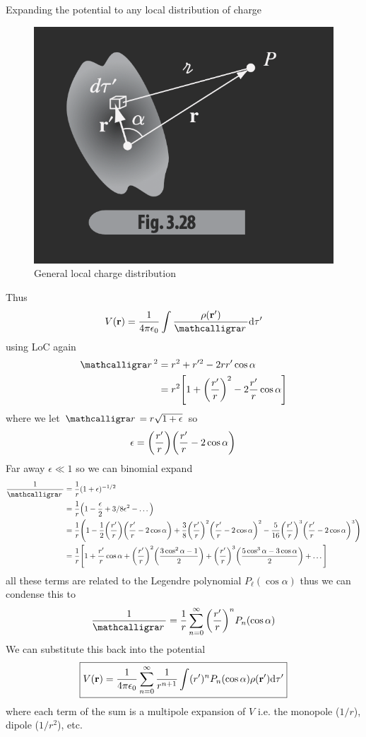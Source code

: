\documentclass[../main.tex]{subfiles}
\begin{document}
\newpage
Expanding the potential to any local distribution of charge
\begin{figure}
    \centering
    \includegraphics[width=0.4\linewidth]{fig3_28.png}
    \caption{General local charge distribution}
    \label{fig:lecture3_28}
\end{figure}
Thus
\begin{align*}
    V(\vb r) = \ke \int \frac{\rho(\vb r')}{\scriptr} \dd\tau'
\end{align*}
using LoC again
\begin{align*}
    \scriptr^2 &= r^2 + r'^2 - 2rr'\cos\alpha \\
    &= r^2 \qt[
        1 + \qt(\frac{r'}{r})^2 - 2\frac{r'}{r}\cos\alpha
    ]
\end{align*}
where we let $\scriptr = r\sqrt{1 + \epsilon}$ so
\begin{align*}
    \epsilon = \qt(\frac{r'}{r}) \qt(
        \frac{r'}{r} - 2\cos\alpha
    )
\end{align*}
Far away $\epsilon \ll 1$ so we can binomial expand
\begin{align*}
    \frac{1}{\scriptr} &= \frac{1}{r} (1 + \epsilon)^{-1/2} \\
    &= \frac{1}{r} \qt(
        1 - \frac{\epsilon}{2} + 3/8 \epsilon^2 - \dots
    ) \\
    &= \frac{1}{r} \qt(
        1 - \frac{1}{2} \qt(\frac{r'}{r}) \qt(\frac{r'}{r} - 2\cos\alpha) 
        + \frac{3}{8} \qt(\frac{r'}{r})^2 \qt(\frac{r'}{r} - 2\cos\alpha)^2
        - \frac{5}{16} \qt(\frac{r'}{r})^3 \qt(\frac{r'}{r} - 2\cos\alpha)^3
    ) \\
    &= \frac{1}{r} \qt[
        1 + \frac{r'}{r} \cos\alpha + \qt(\frac{r'}{r})^2 \qt(\frac{3\cos^2\alpha -1}{2})
        + \qt(\frac{r'}{r})^3 \qt(\frac{5\cos^3\alpha - 3\cos\alpha}{2}) + \dots
    ]
\end{align*}
all these terms are related to the Legendre polynomial $P_\ell(\cos\alpha)$ thus we can condense this to
\begin{align*}
    \frac{1}{\scriptr} = \frac{1}{r} \sum_{n = 0}^\infty \qt(\frac{r'}{r})^n P_n (\cos\alpha)
\end{align*}
We can substitute this back into the potential
\begin{align*}
    \boxed{
        V(\vb r) = \frac{1}{4\pi\epsilon_0} \sum_{n = 0}^\infty \frac{1}{r^{n+1}} \int (r')^n P_n(\cos\alpha) \rho(\vb r') \dd\tau'
    }
\end{align*}
where each term of the sum is a multipole expansion of $V$ i.e. the monopole ($1/r$), dipole ($1/r^2$), etc.
\newpage
\end{document}
